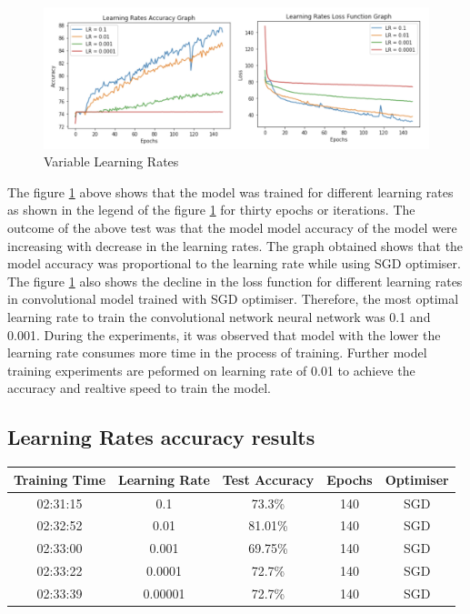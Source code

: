 \begin{figure}[!htp]
    \centering
    \includegraphics[width=15cm]{Images/lr.png}
    \caption{Variable Learning Rates}
    \label{fig:lrates}
\end{figure}

The figure \ref{fig:lrates} above shows that the model was trained for different learning rates as shown
in the legend of the figure \ref{fig:lrates} for thirty epochs or iterations. The outcome of the above test 
was that the model model accuracy of the model were increasing with decrease in the learning rates. 
The graph obtained shows that the model accuracy was proportional to the learning rate while using SGD optimiser. 
The figure \ref{fig:lrates} also shows the decline in the loss function for different learning rates in 
convolutional model trained with SGD optimiser. Therefore, the most optimal learning rate to train the convolutional network 
neural network was 0.1 and 0.001. During the experiments, it was observed that model with the lower the learning rate consumes more time in the 
process of training. Further model training experiments are peformed on 
learning rate of 0.01 to achieve the accuracy and realtive speed to train the model.
\pagebreak

\subsection{ Learning Rates accuracy results}

\begin{center}
    \begin{tabular} { | c | c | c | c | c |}
        \hline
        Training Time & Learning Rate & Test Accuracy & Epochs  & Optimiser\\ 
        \hline
        02:31:15 & 0.1 & 73.3\% & 140 & SGD \\ 
        \hline 
        02:32:52 & 0.01 & 81.01\% & 140 & SGD  \\
        \hline 
        02:33:00 & 0.001 & 69.75\% & 140 & SGD \\
        \hline
        02:33:22 & 0.0001 & 72.7\% & 140 & SGD \\
        \hline
        02:33:39 & 0.00001 & 72.7\% & 140 & SGD \\
        \hline
    \end{tabular}
\end{center}


